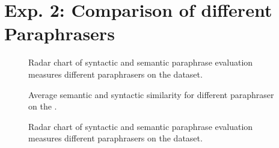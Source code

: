 \section{Exp. 2: Comparison of different Paraphrasers}
\label{sec:app_paraphrases}

\begin{figure}[H]
    \centering
    
    \caption{Radar chart of syntactic and semantic paraphrase evaluation measures different paraphrasers on the \dataBlog{} dataset.}
    \label{fig:radar_blog}
\end{figure}


\begin{figure}[H]
    \centering
    
    \caption{Average semantic and syntactic similarity for different paraphraser on the \dataGutenberg{}.}
    \label{fig:sem_syn_gutenberg}
\end{figure}

\begin{figure}[H]
    \centering
    
    \caption{Radar chart of syntactic and semantic paraphrase evaluation measures different paraphrasers on the \dataGutenberg{} dataset.}
    \label{fig:radar_gutenberg}
\end{figure}

